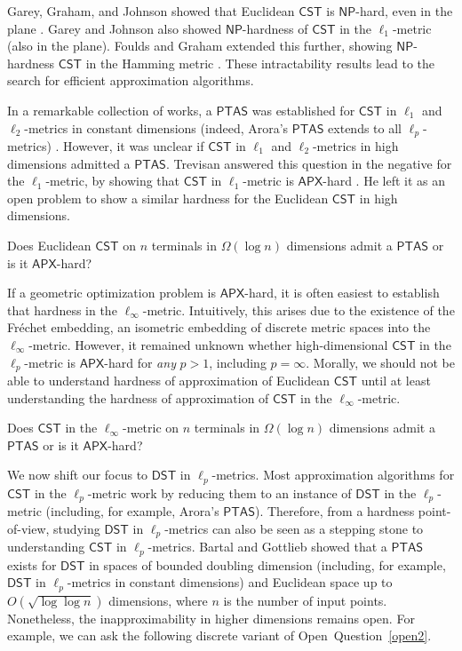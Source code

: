 \documentclass{theoretics}
\newcommand{\1}{\textbf{1}}
\newcommand{\cst}{$\mathsf{CST}$\xspace}
\newcommand{\dst}{$\mathsf{DST}$\xspace}
\newcommand{\np}{$\mathsf{NP}$\xspace}
\newcommand{\apx}{$\mathsf{APX}$\xspace}
\newcommand{\ptas}{$\mathsf{PTAS}$\xspace}
\begin{document}
Garey, Graham, and Johnson showed that Euclidean \cst is \np-hard, even in the plane \cite{Garey_Graham_Johnson_1977}.  Garey and Johnson also showed \np-hardness of \cst in the $\ell_1$-metric \cite{Garey_Johnson_1977} (also in the plane). Foulds and Graham extended this further, showing \np-hardness \cst in the Hamming metric \cite{foulds1982steiner}. These intractability results lead to the search for efficient approximation algorithms. 

In a remarkable collection of works, a \ptas was established for \cst in $\ell_1$ and $\ell_2$-metrics in constant dimensions (indeed, Arora's \ptas extends to all $\ell_p$-metrics) \cite{Arora_1998,Mitchell99,RaoS98}. However, it was unclear  if  \cst in $\ell_1$ and $\ell_2$-metrics in high dimensions admitted a \ptas. Trevisan \cite{Trevisan00} answered this question in the negative for the $\ell_1$-metric, by showing that \cst in $\ell_1$-metric is \apx-hard \cite{Chakrabarty_Devanur_Vazirani_2011,Hanan_1966,Day_Johnson_Sankoff_1986,Wareham_1995}. He left it as an open problem to show a similar hardness for the Euclidean \cst in high dimensions. 
 

\begin{openq}\label{open2}
Does Euclidean \cst on $n$ terminals in $\Omega(\log n)$ dimensions admit a \ptas or is it \apx-hard?
\end{openq}

If a geometric optimization problem is \apx-hard, it is often easiest to establish that hardness in the $\ell_{\infty}$-metric. Intuitively, this arises due to the existence of the Fr\'{e}chet embedding, an isometric embedding of discrete metric spaces into the $\ell_{\infty}$-metric. However, it remained unknown whether high-dimensional \cst in the $\ell_p$-metric is \apx-hard  for \textit{any} $p > 1$, including $p = \infty$. Morally, we should not be able to understand hardness of approximation of Euclidean \cst until at least understanding the hardness of approximation of \cst in the $\ell_{\infty}$-metric.
 
 \begin{openq}\label{open3}
Does \cst in the $\ell_{\infty}$-metric on $n$ terminals in $\Omega(\log n)$ dimensions admit a \ptas or is it \apx-hard?
\end{openq}



We now shift our focus to \dst in $\ell_p$-metrics. Most approximation algorithms for \cst in the $\ell_p$-metric work by reducing them to an instance of \dst in the $\ell_p$-metric (including, for example, Arora's \ptas \cite{Arora_1998}). Therefore, from a hardness point-of-view, studying \dst in $\ell_p$-metrics can also be seen as a stepping stone to understanding \cst in $\ell_p$-metrics. Bartal and Gottlieb \cite{Bartal_Gottlieb_2021} showed that a \ptas exists for \dst in spaces of bounded doubling dimension (including, for example, \dst in $\ell_p$-metrics in constant dimensions) and Euclidean space up to $O(\sqrt{\log \log n})$ dimensions, where $n$ is the number of input points. Nonetheless, the inapproximability in higher dimensions remains open. For example, we can ask the following discrete variant of Open~Question~\ref{open2}.
\end{document}
